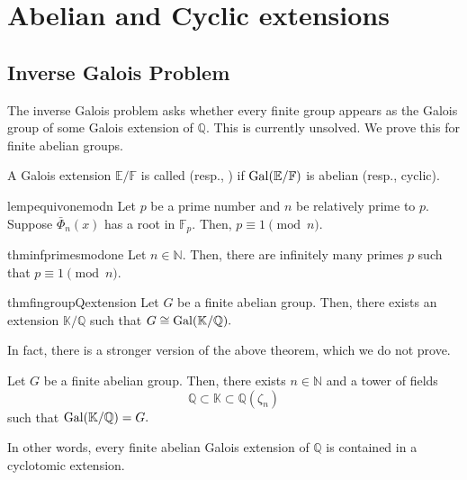 \chapter{Abelian and Cyclic extensions}

\section{Inverse Galois Problem}
The inverse Galois problem asks whether every finite group appears as the Galois group of some Galois extension of $\mathbb{Q}.$ This is currently unsolved. We prove this for finite abelian groups.

\begin{defn}%
	A Galois extension $\mathbb{E}/\mathbb{F}$ is called  (resp., ) if $\operatorname{Gal}(\mathbb{E}/\mathbb{F})$ is abelian (resp., cyclic).
\end{defn}

\begin{restatable}[]{lem}{pequivonemodn}
\label{lem:pequivonemodn}
	Let $p$ be a prime number and $n$ be relatively prime to $p.$ Suppose $\bar{\Phi}_n(x)$ has a root in $\mathbb{F}_p.$ Then, $p \equiv 1 \pmod{n}.$ \hfill\hyperref[lem:pequivonemodn2]{\downsym}
\end{restatable}

\begin{restatable}[]{thm}{infprimesmodone}
\label{thm:infprimesmodone}
	Let $n \in \mathbb{N}.$ Then, there are infinitely many primes $p$ such that $p \equiv 1 \pmod{n}.$ \hfill\hyperref[thm:infprimesmodone2]{\downsym}
\end{restatable}

\begin{restatable}[]{thm}{fingroupQextension}
\label{thm:fingroupQextension}
	Let $G$ be a finite abelian group. Then, there exists an extension $\mathbb{K}/\mathbb{Q}$ such that $G \cong \operatorname{Gal}(\mathbb{K}/\mathbb{Q}).$ \hfill\hyperref[thm:fingroupQextension2]{\downsym}
\end{restatable}

In fact, there is a stronger version of the above theorem, which we do not prove.

\begin{thm}
	Let $G$ be a finite abelian group. Then, there exists $n \in \mathbb{N}$ and a tower of fields
	\begin{equation*} 
		\mathbb{Q} \subset \mathbb{K} \subset \mathbb{Q}(\zeta_n)
	\end{equation*}
	such that $\operatorname{Gal}(\mathbb{K}/\mathbb{Q}) = G.$

	In other words, every finite abelian Galois extension of $\mathbb{Q}$ is contained in a cyclotomic extension.
\end{thm}

